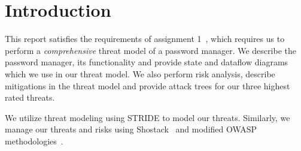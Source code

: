 \chapter{Introduction}
\label{ch:introduction}

This report satisfies the requirements of assignment
1~\cite{2017myersa1handout}, which requires us to perform a
\textit{comprehensive} threat model of a password manager.  We describe the password manager, its functionality and provide state and dataflow diagrams which we use in our threat model. We also perform risk analysis, describe mitigations in the threat model and provide attack trees for our three highest rated threats.

\par We utilize threat modeling using STRIDE to model our threats.  Similarly, we manage our threats and risks using Shostack~\cite{shostackbook} and modified OWASP methodologies~\cite{owasprisk}.




